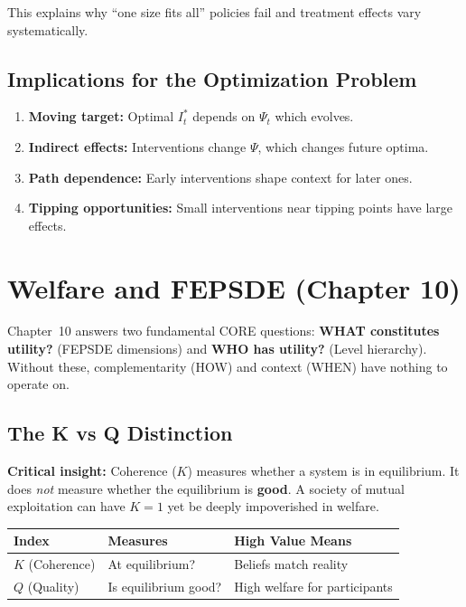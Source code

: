 This explains why ``one size fits all'' policies fail and treatment effects vary systematically.

\subsection{Implications for the Optimization Problem}

\begin{enumerate}[nosep]
\item \textbf{Moving target:} Optimal $I^*_t$ depends on $\Psi_t$ which evolves.
\item \textbf{Indirect effects:} Interventions change $\Psi$, which changes future optima.
\item \textbf{Path dependence:} Early interventions shape context for later ones.
\item \textbf{Tipping opportunities:} Small interventions near tipping points have large effects.
\end{enumerate}

\section{Welfare and FEPSDE (Chapter 10)}
\label{sec:mp-fepsde}

Chapter~10 answers two fundamental CORE questions: \textbf{WHAT constitutes utility?} (FEPSDE dimensions) and \textbf{WHO has utility?} (Level hierarchy). Without these, complementarity (HOW) and context (WHEN) have nothing to operate on.

\subsection{The K vs Q Distinction}

\textbf{Critical insight:} Coherence ($K$) measures whether a system is in equilibrium. It does \emph{not} measure whether the equilibrium is \textbf{good}. A society of mutual exploitation can have $K = 1$ yet be deeply impoverished in welfare.

\begin{center}
\renewcommand{\arraystretch}{1.2}
\begin{tabular}{@{}lll@{}}
\toprule
\textbf{Index} & \textbf{Measures} & \textbf{High Value Means} \\
\midrule
$K$ (Coherence) & At equilibrium? & Beliefs match reality \\
$Q$ (Quality) & Is equilibrium good? & High welfare for participants \\
\bottomrule
\end{tabular}
\end{center}

